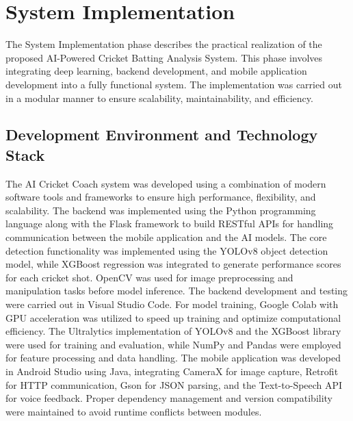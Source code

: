 \chapter{System Implementation}
\label{C6} %
\graphicspath{{Figures/Chapter-6figs/PDF/}{Figures/Chapter-6figs/}}
The System Implementation phase describes the practical realization of the proposed AI-Powered Cricket Batting Analysis System. This phase involves integrating deep learning, backend development, and mobile application development into a fully functional system. The implementation was carried out in a modular manner to ensure scalability, maintainability, and efficiency.
\section{Development Environment and Technology Stack} \label{S6.1}

The AI Cricket Coach system was developed using a combination of modern software tools and frameworks to ensure high performance, flexibility, and scalability. The backend was implemented using the Python programming language along with the Flask framework to build RESTful APIs for handling communication between the mobile application and the AI models. The core detection functionality was implemented using the YOLOv8 object detection model, while XGBoost regression was integrated to generate performance scores for each cricket shot. OpenCV was used for image preprocessing and manipulation tasks before model inference. The backend development and testing were carried out in Visual Studio Code. For model training, Google Colab with GPU acceleration was utilized to speed up training and optimize computational efficiency. The Ultralytics implementation of YOLOv8 and the XGBoost library were used for training and evaluation, while NumPy and Pandas were employed for feature processing and data handling. The mobile application was developed in Android Studio using Java, integrating CameraX for image capture, Retrofit for HTTP communication, Gson for JSON parsing, and the Text-to-Speech API for voice feedback. Proper dependency management and version compatibility were maintained to avoid runtime conflicts between modules.

